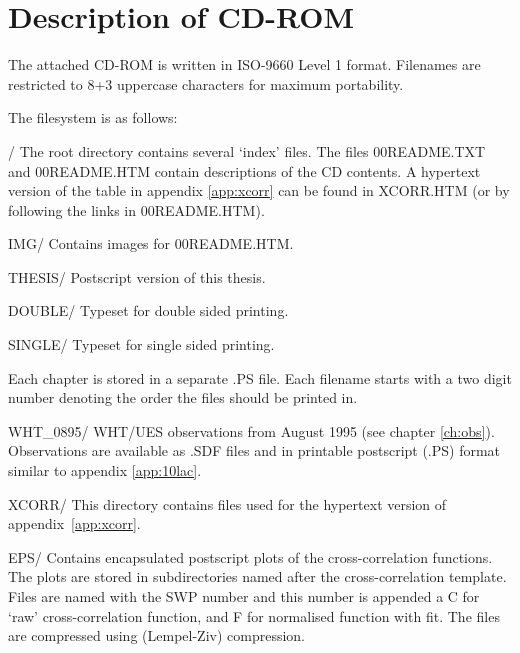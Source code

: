 \chapter{Description of CD-ROM}
\label{app:cdrom}

The attached CD-ROM is written in ISO-9660 Level 1 format. Filenames
are restricted to 8+3 uppercase characters for maximum portability.

The filesystem is as follows:


\newenvironment{Ventry}[1]%
  {\begin{list}{}{\renewcommand{\makelabel}[1]{\texttt{##1}\hfil}%
    \settowidth{\labelwidth}{\textsf{#1:}}%
    \setlength{\leftmargin}{\labelwidth+\labelsep}}}%
  {\end{list}}

\begin{Ventry}{\texttt{123}}
\item[/]
	The root directory contains several `index' files. The files
	00README.TXT and 00README.HTM contain descriptions of the CD
	contents. A hypertext version of the table in appendix
	\ref{app:xcorr} can be found in XCORR.HTM (or by following the
	links in 00README.HTM).

	\begin{Ventry}{{\texttt 1234567890}}
	\item[IMG/]
		Contains images for 00README.HTM.

	\item[THESIS/]
		Postscript version of this thesis. 
		\begin{Ventry}{{\texttt 12345678}}
		\item[DOUBLE/]
			Typeset for double sided printing.
		\item[SINGLE/]
			Typeset for single sided printing.
		\end{Ventry}
		Each chapter is stored in a separate .PS file. Each
		filename starts with a two digit number denoting
		the order the files should be printed in.

	\item[WHT\_0895/]
		WHT/UES observations from August 1995 (see chapter
		\ref{ch:obs}). Observations are available as .SDF
		files and in printable postscript (.PS) format
		similar to appendix \ref{app:10lac}.

	\item[XCORR/] 
		This directory contains files used for the
		hypertext version of appendix~\ref{app:xcorr}.

		\begin{Ventry}{{\texttt 12345678}}
		\item[EPS/]
			Contains encapsulated postscript plots of the
			cross-correlation functions. The plots are
			stored in subdirectories named after the
			cross-correlation template. Files are named
			with the SWP number and this number is
			appended a C for `raw' cross-correlation
			function, and F for normalised function with
			fit. The files are compressed using
			 (Lempel-Ziv) compression.


\end{Ventry}
\end{Ventry}
\end{Ventry}
